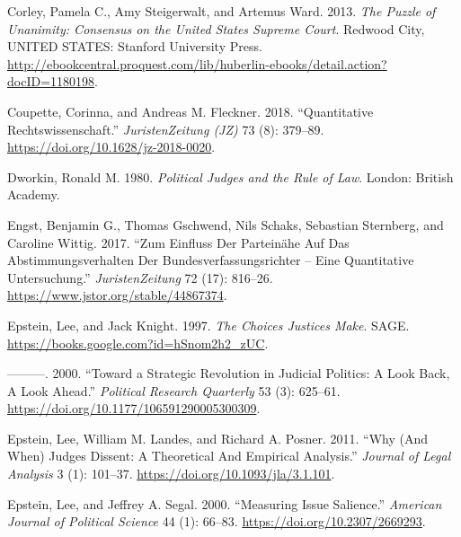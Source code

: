 \documentclass[
  11pt,
]{article}
\newlength{\cslhangindent}
\newenvironment{CSLReferences}[2] %
 {%
  \setlength{\parindent}{0pt}
  \ifodd #1 \everypar{\setlength{\hangindent}{\cslhangindent}}\ignorespaces\fi
  \ifnum #2 > 0
  \setlength{\parskip}{#2\baselineskip}
  \fi
 }%
 {}
\begin{document}
\begin{CSLReferences}{1}{0}
\leavevmode{}%
Corley, Pamela C., Amy Steigerwalt, and Artemus Ward. 2013. \emph{The
{Puzzle} of {Unanimity}: {Consensus} on the {United States Supreme
Court}}. Redwood City, UNITED STATES: Stanford University Press.
\url{http://ebookcentral.proquest.com/lib/huberlin-ebooks/detail.action?docID=1180198}.

\leavevmode{}%
Coupette, Corinna, and Andreas M. Fleckner. 2018. {``Quantitative
{Rechtswissenschaft}.''} \emph{JuristenZeitung (JZ)} 73 (8): 379--89.
\url{https://doi.org/10.1628/jz-2018-0020}.

\leavevmode{}%
Dworkin, Ronald M. 1980. \emph{Political Judges and the Rule of Law}.
London: British Academy.

\leavevmode{}%
Engst, Benjamin G., Thomas Gschwend, Nils Schaks, Sebastian Sternberg,
and Caroline Wittig. 2017. {``Zum {Einfluss} Der {Parteinähe} Auf Das
{Abstimmungsverhalten} Der {Bundesverfassungsrichter} -- Eine
Quantitative {Untersuchung}.''} \emph{JuristenZeitung} 72 (17): 816--26.
\url{https://www.jstor.org/stable/44867374}.

\leavevmode{}%
Epstein, Lee, and Jack Knight. 1997. \emph{The {Choices Justices Make}}.
SAGE. \url{https://books.google.com?id=hSnom2h2_zUC}.

\leavevmode{}%
---------. 2000. {``Toward a {Strategic Revolution} in {Judicial
Politics}: {A Look Back}, {A Look Ahead}.''} \emph{Political Research
Quarterly} 53 (3): 625--61.
\url{https://doi.org/10.1177/106591290005300309}.

\leavevmode{}%
Epstein, Lee, William M. Landes, and Richard A. Posner. 2011. {``Why
({And When}) {Judges Dissent}: {A Theoretical And Empirical
Analysis}.''} \emph{Journal of Legal Analysis} 3 (1): 101--37.
\url{https://doi.org/10.1093/jla/3.1.101}.

\leavevmode{}%
Epstein, Lee, and Jeffrey A. Segal. 2000. {``Measuring {Issue
Salience}.''} \emph{American Journal of Political Science} 44 (1):
66--83. \url{https://doi.org/10.2307/2669293}.


\end{CSLReferences}
\end{document}
